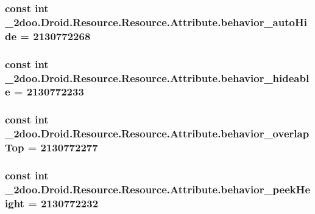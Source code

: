\hypertarget{class__2doo_1_1_droid_1_1_resource_1_1_attribute_cc4a9fdbf5763d851ffb78529852656a}{
\subsubsection[{behavior\_\-autoHide}]{\setlength{\rightskip}{0pt plus 5cm}const int \_\-2doo.Droid.Resource.Resource.Attribute.behavior\_\-autoHide = 2130772268}}
\label{class__2doo_1_1_droid_1_1_resource_1_1_attribute_cc4a9fdbf5763d851ffb78529852656a}


\hypertarget{class__2doo_1_1_droid_1_1_resource_1_1_attribute_0e3072b3e370edcc52c92616f884c5b5}{
\subsubsection[{behavior\_\-hideable}]{\setlength{\rightskip}{0pt plus 5cm}const int \_\-2doo.Droid.Resource.Resource.Attribute.behavior\_\-hideable = 2130772233}}
\label{class__2doo_1_1_droid_1_1_resource_1_1_attribute_0e3072b3e370edcc52c92616f884c5b5}


\hypertarget{class__2doo_1_1_droid_1_1_resource_1_1_attribute_eb17a155921cd0a1888626dea907e703}{
\subsubsection[{behavior\_\-overlapTop}]{\setlength{\rightskip}{0pt plus 5cm}const int \_\-2doo.Droid.Resource.Resource.Attribute.behavior\_\-overlapTop = 2130772277}}
\label{class__2doo_1_1_droid_1_1_resource_1_1_attribute_eb17a155921cd0a1888626dea907e703}


\hypertarget{class__2doo_1_1_droid_1_1_resource_1_1_attribute_a54e731cbe8e5daffeb0924511975a9c}{
\subsubsection[{behavior\_\-peekHeight}]{\setlength{\rightskip}{0pt plus 5cm}const int \_\-2doo.Droid.Resource.Resource.Attribute.behavior\_\-peekHeight = 2130772232}}
\label{class__2doo_1_1_droid_1_1_resource_1_1_attribute_a54e731cbe8e5daffeb0924511975a9c}



